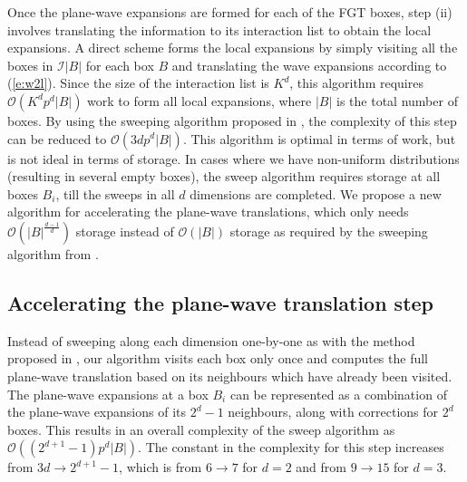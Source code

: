 
Once the plane-wave expansions are formed for each of the FGT boxes, step (ii)
involves translating the information to its interaction list to obtain the
local expansions. A direct scheme forms the local expansions by simply visiting
all the boxes in $\mathcal{I}|B|$ for each box $B$ and translating the wave
expansions according to (\ref{e:w2l}). Since the size of the interaction list
is $K^d$, this algorithm requires $\mathcal{O}(K^dp^d|B|)$ work to form all
local expansions, where $|B|$ is the total number of boxes. By using the
sweeping algorithm proposed in \cite{fggt}, the complexity of this step can be
reduced to $\mathcal{O}(3dp^d|B|)$. This algorithm is optimal in terms of work,
but is not ideal in terms of storage. In cases where we have non-uniform
distributions (resulting in several empty boxes), the sweep algorithm requires
storage at all boxes $B_i$, till the sweeps in all $d$ dimensions are
completed. We propose a new algorithm for accelerating the plane-wave
translations, which only needs $\mathcal{O}(|B|^\frac{d-1}{d})$ storage instead
of $\mathcal{O}(|B|)$ storage as required by the sweeping algorithm from
\cite{fggt}. 

\subsection{Accelerating the plane-wave translation step} Instead of sweeping
along each dimension one-by-one as with the method proposed in \cite{fggt}, our
algorithm visits each box only once and computes the full plane-wave
translation based on its neighbours which have already been visited. The
plane-wave expansions at a box $B_i$ can be represented as a combination of the
plane-wave expansions of its $2^{d} -1$ neighbours, along with corrections for
$2^d$ boxes. This results in an overall complexity of the sweep algorithm as
$\mathcal{O}((2^{d+1} -1)p^d|B|)$. The constant in the
complexity for this step increases from $3d\rightarrow2^{d+1} - 1$, which is
from $6\rightarrow7$ for $d=2$ and from $9\rightarrow15$ for $d=3$. 

